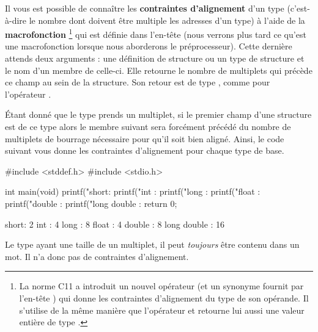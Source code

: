 Il vous est possible de connaître les \textbf{contraintes d'alignement}
d'un type (c'est-à-dire le nombre dont doivent être multiple les
adresses d'un type) à l'aide de la \textbf{macrofonction}
\footnote{\footnotesize{La norme C11 a introduit un nouvel
  opérateur  (et un synonyme  fournit
  par l'en-tête ) qui donne
  les contraintes d'alignement du type de son opérande. Il s'utilise de
  la même manière que l'opérateur  et retourne lui aussi
  une valeur entière de type .}} qui est définie dans l'en-tête
 (nous verrons plus tard ce
qu'est une macrofonction lorsque nous aborderons le préprocesseur).
Cette dernière attends deux arguments : une définition de structure ou
un type de structure et le nom d'un membre de celle-ci. Elle retourne le
nombre de multiplets qui précède ce champ au sein de la structure. Son
retour est de type , comme pour l'opérateur
.

Étant donné que le type  prends un multiplet, si le premier
champ d'une structure est de ce type alors le membre suivant sera
forcément précédé du nombre de multiplets de bourrage nécessaire pour
qu'il soit bien aligné. Ainsi, le code suivant vous donne les
contraintes d'alignement pour chaque type de base.

\begin{C}
#include <stddef.h>
#include <stdio.h>


int main(void)
{
    printf("short: %
    printf("int : %
    printf("long : %
    printf("float : %
    printf("double : %
    printf("long double : %
    return 0;
}
\end{C}

\begin{C}
short: 2
int : 4
long : 8
float : 4
double : 8
long double : 16
\end{C}

\begin{infobox}
Le type  ayant une taille de un multiplet, il peut 
\emph{toujours} être contenu dans un mot. Il n'a donc pas de 
contraintes d'alignement.
\end{infobox}


